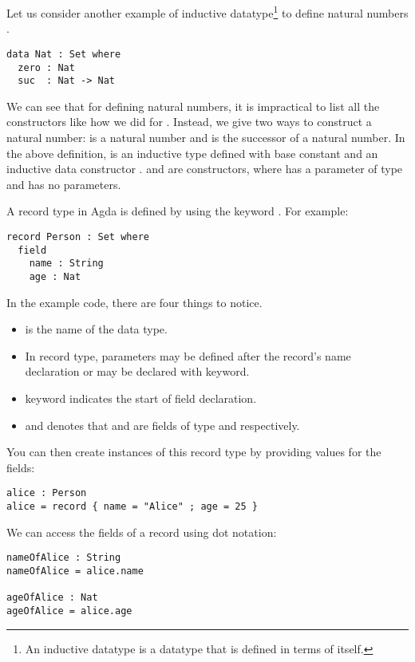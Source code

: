 Let us consider another example of inductive datatype\footnote{An inductive
datatype is a datatype that is defined in terms of itself.} to define natural
numbers . 

\begin{verbatim}
data Nat : Set where
  zero : Nat
  suc  : Nat -> Nat
\end{verbatim}
\label{code:Nat}

We can see that for defining natural numbers, it is impractical to list all the
constructors like how we did for . Instead, we give two ways to
construct a natural number:  is a natural number and 
is the successor of a natural number. In the above definition,  is
an inductive type defined with base constant  and an inductive data
constructor .  and  are constructors, where
 has a parameter of type  and  has no
parameters. 

A record type in Agda is defined by using the keyword . For
example:

\begin{verbatim}
record Person : Set where
  field
    name : String
    age : Nat
\end{verbatim}

In the example code, there are four things to notice.
\begin{itemize}
  \item {} is the name of the data type.
  \item In record type, parameters may be defined after the record's name
  declaration or may be declared with  keyword.
  \item {} keyword indicates the start of field declaration.
  \item {} and  denotes that 
  and  are fields of type  and 
  respectively.
\end{itemize}

You can then create instances of this record type by providing values for the
fields:

\begin{verbatim}
alice : Person
alice = record { name = "Alice" ; age = 25 }
\end{verbatim}

We can access the fields of a record using dot notation:
\begin{verbatim}
nameOfAlice : String
nameOfAlice = alice.name

ageOfAlice : Nat
ageOfAlice = alice.age
\end{verbatim}

